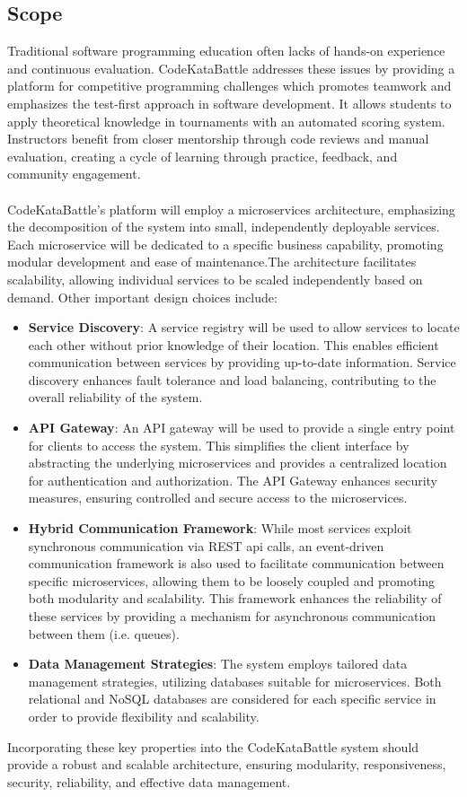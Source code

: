 \subsection{Scope}
Traditional software programming education often lacks of hands-on experience and continuous evaluation. CodeKataBattle addresses these issues by providing a platform for competitive programming challenges which promotes teamwork and emphasizes the test-first approach in software development. It allows students to apply theoretical knowledge in tournaments with an automated scoring system. Instructors benefit from closer mentorship through code reviews and manual evaluation, creating a cycle of learning through practice, feedback, and community engagement.
\\\\CodeKataBattle's platform will employ a microservices architecture, emphasizing the decomposition of the system into small, independently deployable services. Each microservice will be dedicated to a specific business capability, promoting modular development and ease of maintenance.The architecture facilitates scalability, allowing individual services to be scaled independently based on demand.
Other important design choices include:
\begin{itemize}
    \item \textbf{Service Discovery}: A service registry will be used to allow services to locate each other without prior knowledge of their location. This enables efficient communication between services by providing up-to-date information. Service discovery enhances fault tolerance and load balancing, contributing to the overall reliability of the system.
    \item \textbf{API Gateway}: An API gateway will be used to provide a single entry point for clients to access the system. This simplifies the client interface by abstracting the underlying microservices and provides a centralized location for authentication and authorization. The API Gateway enhances security measures, ensuring controlled and secure access to the microservices.
    \item \textbf{Hybrid Communication Framework}: While most services exploit synchronous communication via REST api calls, an event-driven communication framework is also used to facilitate communication between specific microservices, allowing them to be loosely coupled and promoting both modularity and scalability. This framework enhances the reliability of these services by providing a mechanism for asynchronous communication between them (i.e. queues).
    \item \textbf{Data Management Strategies}: The system employs tailored data management strategies, utilizing databases suitable for microservices. Both relational and NoSQL databases are considered for each specific service in order to provide flexibility and scalability.
\end{itemize}
Incorporating these key properties into the CodeKataBattle system should provide a robust and scalable architecture, ensuring modularity, responsiveness, security, reliability, and effective data management.

